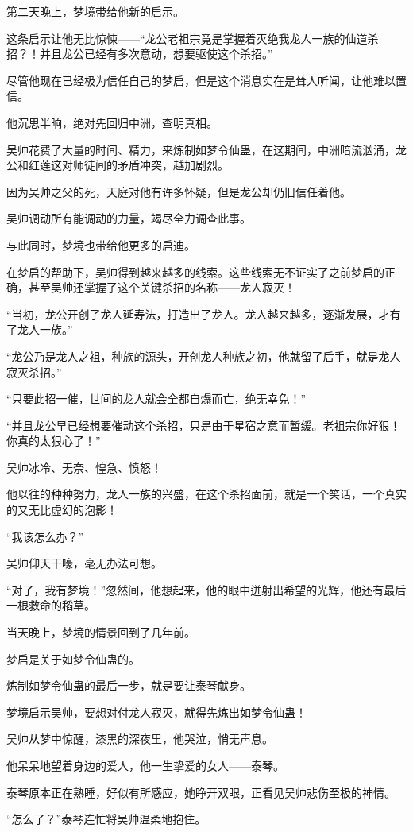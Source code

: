 \begin{this_body}
第二天晚上，梦境带给他新的启示。

这条启示让他无比惊悚——“龙公老祖宗竟是掌握着灭绝我龙人一族的仙道杀招？！并且龙公已经有多次意动，想要驱使这个杀招。”

尽管他现在已经极为信任自己的梦启，但是这个消息实在是耸人听闻，让他难以置信。

他沉思半晌，绝对先回归中洲，查明真相。

吴帅花费了大量的时间、精力，来炼制如梦令仙蛊，在这期间，中洲暗流汹涌，龙公和红莲这对师徒间的矛盾冲突，越加剧烈。

因为吴帅之父的死，天庭对他有许多怀疑，但是龙公却仍旧信任着他。

吴帅调动所有能调动的力量，竭尽全力调查此事。

与此同时，梦境也带给他更多的启迪。

在梦启的帮助下，吴帅得到越来越多的线索。这些线索无不证实了之前梦启的正确，甚至吴帅还掌握了这个关键杀招的名称——龙人寂灭！

“当初，龙公开创了龙人延寿法，打造出了龙人。龙人越来越多，逐渐发展，才有了龙人一族。”

“龙公乃是龙人之祖，种族的源头，开创龙人种族之初，他就留了后手，就是龙人寂灭杀招。”

“只要此招一催，世间的龙人就会全都自爆而亡，绝无幸免！”

“并且龙公早已经想要催动这个杀招，只是由于星宿之意而暂缓。老祖宗你好狠！你真的太狠心了！”

吴帅冰冷、无奈、惶急、愤怒！

他以往的种种努力，龙人一族的兴盛，在这个杀招面前，就是一个笑话，一个真实的又无比虚幻的泡影！

“我该怎么办？”

吴帅仰天干嚎，毫无办法可想。

“对了，我有梦境！”忽然间，他想起来，他的眼中迸射出希望的光辉，他还有最后一根救命的稻草。

当天晚上，梦境的情景回到了几年前。

梦启是关于如梦令仙蛊的。

炼制如梦令仙蛊的最后一步，就是要让泰琴献身。

梦境启示吴帅，要想对付龙人寂灭，就得先炼出如梦令仙蛊！

吴帅从梦中惊醒，漆黑的深夜里，他哭泣，悄无声息。

他呆呆地望着身边的爱人，他一生挚爱的女人——泰琴。

泰琴原本正在熟睡，好似有所感应，她睁开双眼，正看见吴帅悲伤至极的神情。

“怎么了？”泰琴连忙将吴帅温柔地抱住。


\end{this_body}
